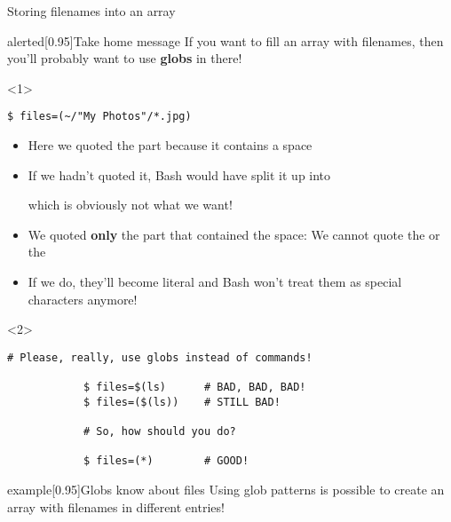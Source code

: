 \begin{frame}[fragile]{Storing filenames into an array}
    \begin{varblock}{alerted}[0.95\textwidth]{Take home message}
        If you want to fill an array with filenames, then you'll probably want to use \alert{\textbf{globs}} in there!
    \end{varblock}
    \medskip
    \begin{onlyenv}<1>
        \begin{lstlisting}[style=MyBash, numbers=none, xleftmargin=30mm, xrightmargin=30mm]
            $ files=(~/"My Photos"/*.jpg)
        \end{lstlisting}
        \medskip
        \begin{itemize}
            \item Here we quoted the  part because it contains a space
            \item If we hadn't quoted it, Bash would have split it up into\\ \centerline{\small{}} which is obviously not what we want!
            \item We quoted \textbf{only} the part that contained the space: We cannot quote the \PB{\texttt{\textasciitilde}} or the \PB{\texttt{*}}
            \item If we do, they'll become literal and Bash won't treat them as special characters anymore!
        \end{itemize}
    \end{onlyenv}
    \begin{onlyenv}<2>
        \begin{lstlisting}[style=MyBash, numbers=none]
            # Please, really, use globs instead of commands!

            $ files=$(ls)      # BAD, BAD, BAD!
            $ files=($(ls))    # STILL BAD!

            # So, how should you do?

            $ files=(*)        # GOOD!
        \end{lstlisting}
        \medskip
        \begin{varblock}{example}[0.95\textwidth]{Globs know about files}
            Using glob patterns is possible to create an array with filenames in different entries!
        \end{varblock}
    \end{onlyenv}
\end{frame}
